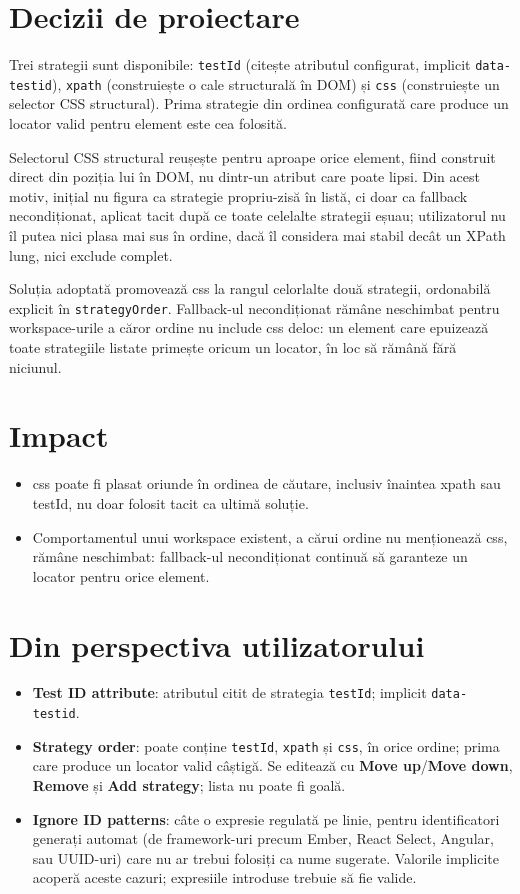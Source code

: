 \documentclass[12pt,a4paper]{report}
\newcommand{\UI}[1]{\textbf{#1}}
\newcommand{\File}[1]{\nolinkurl{#1}}
\begin{document}
\section{Decizii de proiectare}

Trei strategii sunt disponibile: \File{testId} (citește atributul configurat, implicit \File{data-testid}), \File{xpath} (construiește o cale structurală în DOM) și \File{css} (construiește un selector CSS structural). Prima strategie din ordinea configurată care produce un locator valid pentru element este cea folosită.

Selectorul CSS structural reușește pentru aproape orice element, fiind construit direct din poziția lui în DOM, nu dintr-un atribut care poate lipsi. Din acest motiv, inițial nu figura ca strategie propriu-zisă în listă, ci doar ca fallback necondiționat, aplicat tacit după ce toate celelalte strategii eșuau; utilizatorul nu îl putea nici plasa mai sus în ordine, dacă îl considera mai stabil decât un XPath lung, nici exclude complet.

Soluția adoptată promovează css la rangul celorlalte două strategii, ordonabilă explicit în \File{strategyOrder}. Fallback-ul necondiționat rămâne neschimbat pentru workspace-urile a căror ordine nu include css deloc: un element care epuizează toate strategiile listate primește oricum un locator, în loc să rămână fără niciunul.

\section{Impact}

\begin{itemize}
  \item css poate fi plasat oriunde în ordinea de căutare, inclusiv înaintea xpath sau testId, nu doar folosit tacit ca ultimă soluție.
  \item Comportamentul unui workspace existent, a cărui ordine nu menționează css, rămâne neschimbat: fallback-ul necondiționat continuă să garanteze un locator pentru orice element.
\end{itemize}

\section{Din perspectiva utilizatorului}

\begin{itemize}
  \item \UI{Test ID attribute}: atributul citit de strategia \File{testId}; implicit \File{data-testid}.
  \item \UI{Strategy order}: poate conține \File{testId}, \File{xpath} și \File{css}, în orice ordine; prima care produce un locator valid câștigă. Se editează cu \UI{Move up}/\UI{Move down}, \UI{Remove} și \UI{Add strategy}; lista nu poate fi goală.
  \item \UI{Ignore ID patterns}: câte o expresie regulată pe linie, pentru identificatori generați automat (de framework-uri precum Ember, React Select, Angular, sau UUID-uri) care nu ar trebui folosiți ca nume sugerate. Valorile implicite acoperă aceste cazuri; expresiile introduse trebuie să fie valide.
\end{itemize}
\end{document}
